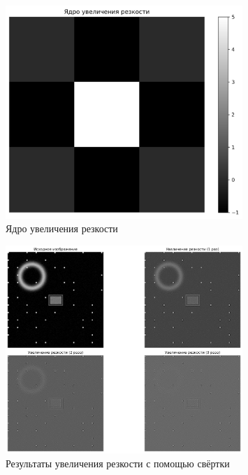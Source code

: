 \begin{figure}[H]
    \centering
    \includegraphics[width=0.8\textwidth]{images/task3/sharpening_kernel.png}
    \caption{Ядро увеличения резкости}
    \label{fig:sharpening_kernel}
\end{figure}

\begin{figure}[H]
    \centering
    \includegraphics[width=0.8\textwidth]{images/task3/convolution_results.png}
    \caption{Результаты увеличения резкости с помощью свёртки}
    \label{fig:convolution_sharp}
\end{figure}


